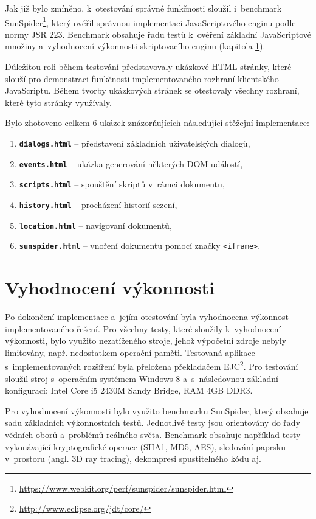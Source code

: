 Jak již bylo zmíněno, k~otestování správné funkčnosti sloužil i~benchmark SunSpider\footnote{\url{https://www.webkit.org/perf/sunspider/sunspider.html}}, který ověřil správnou implementaci JavaScriptového enginu podle normy JSR 223. Benchmark obsahuje řadu testů k~ověření základní JavaScriptové množiny a~vyhodnocení výkonnosti skriptovacího enginu (kapitola \ref{Chapter.Performance}).

Důležitou roli během testování představovaly ukázkové HTML stránky, které slouží pro demonstraci funkčnosti implementovaného rozhraní klientského JavaScriptu. Během tvorby ukázkových stránek se otestovaly všechny rozhraní, které tyto stránky využívaly. 

\bigskip \noindent Bylo zhotoveno celkem 6 ukázek znázorňujících následující stěžejní implementace:

\begin{enumerate}
  \item \textbf{\texttt{dialogs.html}} -- představení základních uživatelských dialogů,
  \item \textbf{\texttt{events.html}} -- ukázka generování některých DOM událostí,
  \item \textbf{\texttt{scripts.html}} -- spouštění skriptů v~rámci dokumentu,
  \item \textbf{\texttt{history.html}} -- procházení historií sezení,
  \item \textbf{\texttt{location.html}} -- navigovaní dokumentů,
  \item \textbf{\texttt{sunspider.html}} -- vnoření dokumentu pomocí značky \texttt{<iframe>}.
\end{enumerate}

\section{Vyhodnocení výkonnosti}
\label{Chapter.Performance}

Po dokončení implementace a~jejím otestování byla vyhodnocena výkonnost implementovaného řešení. Pro všechny testy, které sloužily k~vyhodnocení výkonnosti, bylo využito nezatíženého stroje, jehož výpočetní zdroje nebyly limitovány, např. nedostatkem operační paměti. Testovaná aplikace s~implementovaných rozšíření byla přeložena překladačem EJC\footnote{\url{http://www.eclipse.org/jdt/core/}}. Pro testování sloužil stroj s~operačním systémem Windows 8 a~s~následovnou základní konfigurací: Intel Core i5 2430M Sandy Bridge, RAM 4GB DDR3.

Pro vyhodnocení výkonnosti bylo využito benchmarku SunSpider, který obsahuje sadu základních výkonnostních testů. Jednotlivé testy jsou orientovány do řady vědních oborů a~problémů reálného světa. Benchmark obsahuje například testy vykonávající kryptografické operace (SHA1, MD5, AES), sledování paprsku v~prostoru (angl. 3D ray tracing), dekompresi spustitelného kódu aj.

